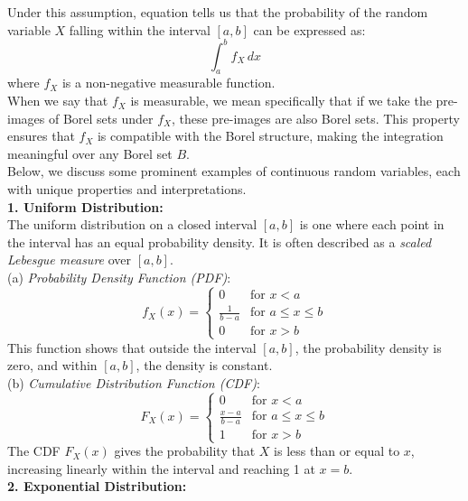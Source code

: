 Under this assumption, equation tells us that the probability of the random variable \( X \) falling within the interval \([a, b]\) can be expressed as:
\[
\int_a^b f_X \, dx
\]
where \( f_X \) is a non-negative measurable function.\\

When we say that \( f_X \) is measurable, we mean specifically that if we take the pre-images of Borel sets under \( f_X \), these pre-images are also Borel sets. This property ensures that \( f_X \) is compatible with the Borel structure, making the integration meaningful over any Borel set \( B \). \\

Below, we discuss some prominent examples of continuous random variables, each with unique properties and interpretations.\\

\textbf{1. Uniform Distribution:} \\

The uniform distribution on a closed interval \([a, b]\) is one where each point in the interval has an equal probability density. It is often described as a \textit{scaled Lebesgue measure} over \([a, b]\).\\

(a) \textit{Probability Density Function (PDF)}:
    \[
    f_X(x) = 
    \begin{cases} 
      0 & \text{for } x < a \\
      \frac{1}{b-a} & \text{for } a \leq x \leq b \\
      0 & \text{for } x > b 
   \end{cases}
    \]
    This function shows that outside the interval \([a, b]\), the probability density is zero, and within \([a, b]\), the density is constant.\\

(b) \textit{Cumulative Distribution Function (CDF)}:
    \[
    F_X(x) = 
    \begin{cases} 
      0 & \text{for } x < a \\
      \frac{x - a}{b - a} & \text{for } a \leq x \leq b \\
      1 & \text{for } x > b 
   \end{cases}
    \]
    The CDF \(F_X(x)\) gives the probability that \(X\) is less than or equal to \(x\), increasing linearly within the interval and reaching 1 at \(x = b\).\\

\textbf{2. Exponential Distribution:} \\

